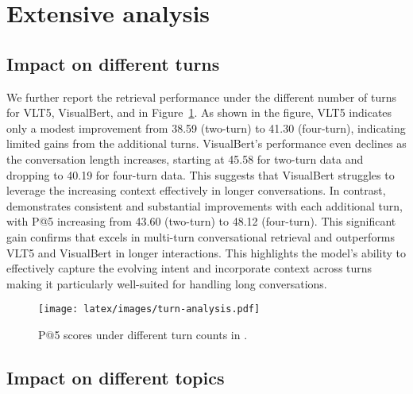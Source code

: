 \documentclass[11pt]{article}
\begin{document}
 

\section{Extensive analysis}
\subsection{Impact on different turns}
We further report the retrieval performance under the different number of turns for VLT5, VisualBert, and \OurModel{} in Figure~\ref{fig:fig3}. As shown in the figure, VLT5 indicates only a modest improvement from 38.59 (two-turn) to 41.30 (four-turn), indicating limited gains from the additional turns. VisualBert's performance even declines as the conversation length increases, starting at 45.58 for two-turn data and dropping to 40.19 for four-turn data. This suggests that VisualBert struggles to leverage the increasing context effectively in longer conversations.
In contrast, \OurModel{} demonstrates consistent and substantial improvements with each additional turn, with P@5 increasing from 43.60 (two-turn) to 48.12 (four-turn). This significant gain confirms that \OurModel{} excels in multi-turn conversational retrieval and outperforms VLT5 and VisualBert in longer interactions. This highlights the model’s ability to effectively capture the evolving intent and incorporate context across turns making it particularly well-suited for handling long conversations.


\begin{figure}[t]
  \texttt{[image: latex/images/turn-analysis.pdf]}
  \caption{P@5 scores under different turn counts in \OurData{}.}
  \label{fig:fig3}
  \vspace{-4mm}
\end{figure}






\subsection{Impact on different topics}
\end{document}
